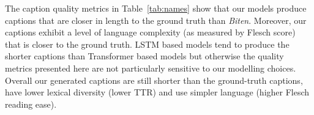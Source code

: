 The caption quality metrics in Table~\ref{tab:names} show that our
models produce captions that are closer in length to the ground truth than
\textit{Biten}. Moreover, our captions exhibit a level of language complexity
(as measured
by Flesch score) that is closer to the ground truth. LSTM based
models tend to produce the shorter captions than Transformer based models but
otherwise the quality metrics presented here are not particularly sensitive to
our modelling choices. Overall our generated captions
are still
shorter than the ground-truth captions, have lower lexical diversity (lower TTR)
and use simpler language (higher Flesch reading ease).

